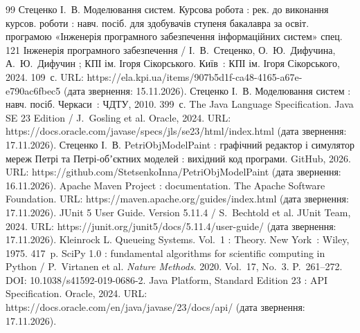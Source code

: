 \begin{thebibliography}{99}
 Стеценко І.~В. Моделювання систем. Курсова робота : рек. до виконання курсов. роботи :
  навч. посіб. для здобувачів ступеня бакалавра за освіт. програмою «Інженерія програмного забезпечення
  інформаційних систем» спец. 121 Інженерія програмного забезпечення / І.~В.~Стеценко, О.~Ю.~Дифучина,
  А.~Ю.~Дифучин ; КПІ ім. Ігоря Сікорського. Київ~: КПІ ім. Ігоря Сікорського, 2024. 109~с.
  URL: https://ela.kpi.ua/items/907b5d1f-ca48-4165-a67e-e790ac6fbec5 (дата звернення: 15.11.2026).
 Стеценко І.~В. Моделювання систем : навч. посіб. Черкаси~: ЧДТУ, 2010. 399~с.
 The Java Language Specification. Java SE 23 Edition / J.~Gosling et al. Oracle, 2024.
  URL: https://docs.oracle.com/javase/specs/jls/se23/html/index.html (дата звернення: 17.11.2026).
 Стеценко І.~В. PetriObjModelPaint : графічний редактор і симулятор мереж Петрі
  та Петрі-обʼєктних моделей : вихідний код програми. GitHub, 2026.
  URL: https://github.com/StetsenkoInna/PetriObjModelPaint (дата звернення: 16.11.2026).
 Apache Maven Project : documentation. The Apache Software Foundation.
  URL: https://maven.apache.org/guides/index.html (дата звернення: 17.11.2026).
 JUnit 5 User Guide. Version 5.11.4 / S.~Bechtold et al. JUnit Team, 2024.
  URL: https://junit.org/junit5/docs/5.11.4/user-guide/ (дата звернення: 17.11.2026).
 Kleinrock L. Queueing Systems. Vol.~1 : Theory. New York~: Wiley, 1975. 417~p.
 SciPy 1.0 : fundamental algorithms for scientific computing in Python / P.~Virtanen et al.
  \textit{Nature Methods}. 2020. Vol.~17, No.~3. P.~261--272. DOI: 10.1038/s41592-019-0686-2.
 Java Platform, Standard Edition 23 : API Specification. Oracle, 2024.
  URL: https://docs.oracle.com/en/java/javase/23/docs/api/ (дата звернення: 17.11.2026).
\end{thebibliography}

